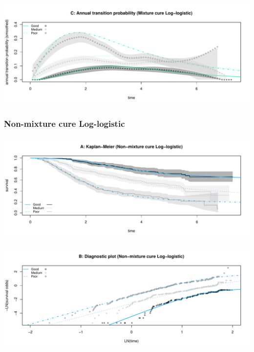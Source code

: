 \documentclass[
]{article}
\begin{document}
\begin{flushleft}\includegraphics[height=0.25\textheight]{BC_OS_output/Images/Figure_cure_models-15} \end{flushleft}

\clearpage

\subsubsection{Non-mixture cure
Log-logistic}\label{non-mixture-cure-log-logistic}

\begin{flushleft}\includegraphics[height=0.25\textheight]{BC_OS_output/Images/Figure_cure_models-16} \end{flushleft}

\begin{flushleft}\includegraphics[height=0.25\textheight]{BC_OS_output/Images/Figure_cure_models-17} \end{flushleft}
\end{document}

